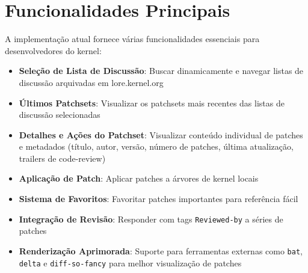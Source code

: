 \section{Funcionalidades Principais}

A implementação atual fornece várias funcionalidades essenciais para desenvolvedores do kernel:

\begin{itemize}
    \item \textbf{Seleção de Lista de Discussão}: Buscar dinamicamente e navegar listas de discussão arquivadas em lore.kernel.org
    \item \textbf{Últimos Patchsets}: Visualizar os patchsets mais recentes das listas de discussão selecionadas
    \item \textbf{Detalhes e Ações do Patchset}: Visualizar conteúdo individual de patches e metadados (título, autor, versão, número de patches, última atualização, trailers de code-review)
    \item \textbf{Aplicação de Patch}: Aplicar patches a árvores de kernel locais
    \item \textbf{Sistema de Favoritos}: Favoritar patches importantes para referência fácil
    \item \textbf{Integração de Revisão}: Responder com tags \texttt{Reviewed-by} a séries de patches
    \item \textbf{Renderização Aprimorada}: Suporte para ferramentas externas como \texttt{bat}, \texttt{delta} e \texttt{diff-so-fancy} para melhor visualização de patches
\end{itemize}
